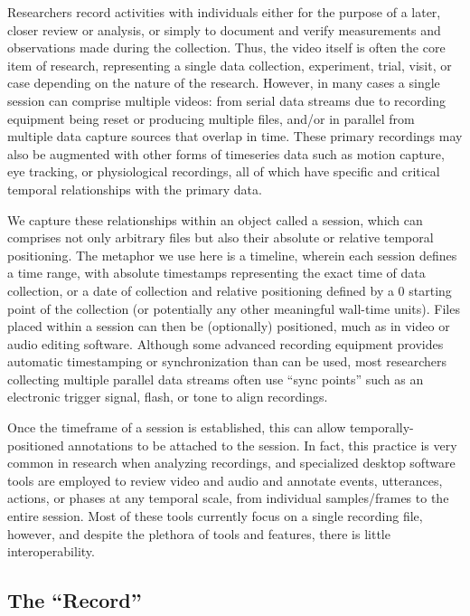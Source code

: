 \documentclass{sig-alternate}
\begin{document}
Researchers record activities with individuals either for the purpose of a later, closer review or analysis, or simply to document and verify measurements and observations made during the collection.
Thus, the video itself is often the core item of research, representing a single data collection, experiment, trial, visit, or case depending on the nature of the research.
However, in many cases a single session can comprise multiple videos: from serial data streams due to recording equipment being reset or producing multiple files, and/or in parallel from multiple data capture sources that overlap in time.
These primary recordings may also be augmented with other forms of timeseries data such as motion capture, eye tracking, or physiological recordings, all of which have specific and critical temporal relationships with the primary data.

We capture these relationships within an object called a session, which can comprises not only arbitrary files but also their absolute or relative temporal positioning.
The metaphor we use here is a timeline, wherein each session defines a time range, with absolute timestamps representing the exact time of data collection, or a date of collection and relative positioning defined by a 0 starting point of the collection (or potentially any other meaningful wall-time units).
Files placed within a session can then be (optionally) positioned, much as in video or audio editing software.
Although some advanced recording equipment provides automatic timestamping or synchronization than can be used, most researchers collecting multiple parallel data streams often use ``sync points'' such as an electronic trigger signal, flash, or tone to align recordings.

Once the timeframe of a session is established, this can allow temporally-positioned annotations to be attached to the session.
In fact, this practice is very common in research when analyzing recordings, and specialized desktop software tools are employed to review video and audio and annotate events, utterances, actions, or phases at any temporal scale, from individual samples/frames to the entire session.
Most of these tools currently focus on a single recording file, however, and despite the plethora of tools and features, there is little interoperability.

\subsection{The ``Record''}
\end{document}
